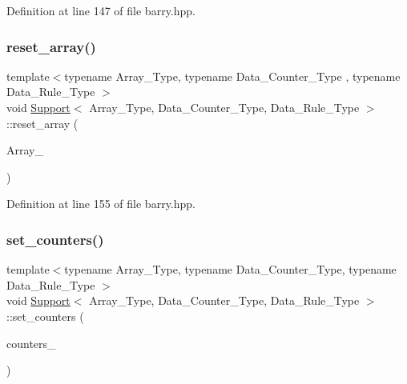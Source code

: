 Definition at line 147 of file barry.\+hpp.

\mbox{\label{classbarry_1_1_support_a6e39b22dfd1e0a0ceebf596c974f5326}} 
\subsubsection{\texorpdfstring{reset\+\_\+array()}{reset\_array()}\hspace{0.1cm}{\footnotesize\ttfamily [2/2]}}
{\footnotesize\ttfamily template$<$typename Array\+\_\+\+Type, typename Data\+\_\+\+Counter\+\_\+\+Type , typename Data\+\_\+\+Rule\+\_\+\+Type $>$ \\
void \hyperlink{classbarry_1_1_support}{Support}$<$ Array\+\_\+\+Type, Data\+\_\+\+Counter\+\_\+\+Type, Data\+\_\+\+Rule\+\_\+\+Type $>$\+::reset\+\_\+array (\begin{DoxyParamCaption}\item[{const Array\+\_\+\+Type $\ast$}]{Array\+\_\+ }\end{DoxyParamCaption})\hspace{0.3cm}{\ttfamily [inline]}}



Definition at line 155 of file barry.\+hpp.

\mbox{\label{classbarry_1_1_support_aa6070db8aa83e220b8c9a1d80dfb57c0}} 
\subsubsection{\texorpdfstring{set\+\_\+counters()}{set\_counters()}}
{\footnotesize\ttfamily template$<$typename Array\+\_\+\+Type, typename Data\+\_\+\+Counter\+\_\+\+Type, typename Data\+\_\+\+Rule\+\_\+\+Type $>$ \\
void \hyperlink{classbarry_1_1_support}{Support}$<$ Array\+\_\+\+Type, Data\+\_\+\+Counter\+\_\+\+Type, Data\+\_\+\+Rule\+\_\+\+Type $>$\+::set\+\_\+counters (\begin{DoxyParamCaption}\item[{\hyperlink{classbarry_1_1_counter_vector}{Counter\+Vector}$<$ Array\+\_\+\+Type, Data\+\_\+\+Counter\+\_\+\+Type $>$ $\ast$}]{counters\+\_\+ }\end{DoxyParamCaption})\hspace{0.3cm}{\ttfamily [inline]}}



